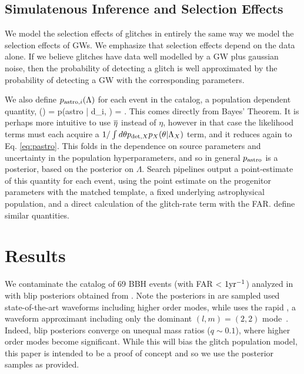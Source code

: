 \begin{refsection}
\subsection{Simulatenous Inference and Selection Effects}

We model the selection effects of glitches in entirely the same way we model the selection effects of GWs.
We emphasize that selection effects depend on the data alone. If we believe glitches have data well modelled by a GW plus gaussian noise, then the probability of detecting a glitch is well approximated by the probability of detecting a GW with the corresponding parameters. 

We also define $p_{{\rm astro},i}(\Lambda)$ for each event in the catalog, a population dependent quantity, 
\beq
\pastroi(\Lambda) = p({\rm astro} | d_i, \Lambda) = .
\label{eq:pastro}
\eeq
This comes directly from Bayes' Theorem. It is perhaps more intuitive to use $\overline{\eta}$ instead of $\eta$, however in that case the likelihood terms must each acquire a $1/\int d\theta p_{{\rm det},X}p_X(\theta|\Lambda_X)$ term, and it reduces again to Eq. \ref{eq:pastro}. This folds in the dependence on source parameters and uncertainty in the population hyperparameters, and so in general $p_{\rm astro}$ is a posterior, based on the posterior on $\Lambda$. Search pipelines output a point-estimate of this quantity for each event, using the point estimate on the progenitor parameters with the matched template, a fixed underlying astrophysical population, and a direct calculation of the glitch-rate term with the FAR. \cite{2015PhRvD..91b3005F, 2020CQGra..37d5007K} define similar quantities.

\section{Results}
\label{sec: gpop results}
We contaminate the catalog of 69 BBH events (with FAR < $1{\rm yr}^{-1}$) analyzed in \cite{PhysRevX.13.011048} with blip posteriors obtained from \cite{2022CQGra..39q5004A}. Note the posteriors in \cite{PhysRevX.13.011048} are sampled used state-of-the-art waveforms including higher order modes, while \cite{2022CQGra..39q5004A} uses the rapid \pvtwo, a waveform approximant including only the dominant $(l,m)=(2,2)$ mode~\citep{IMRPhenomPv2-I_husa2016,IMRPhenomPv2-II_khan2016,HannamIMRPhenomP,Bohe2016}. Indeed, blip posteriors converge on unequal mass ratios ($q \sim 0.1$), where higher order modes become significant. While this will bias the glitch population model, this paper is intended to be a proof of concept and so we use the posterior samples as provided. 


\end{refsection}

